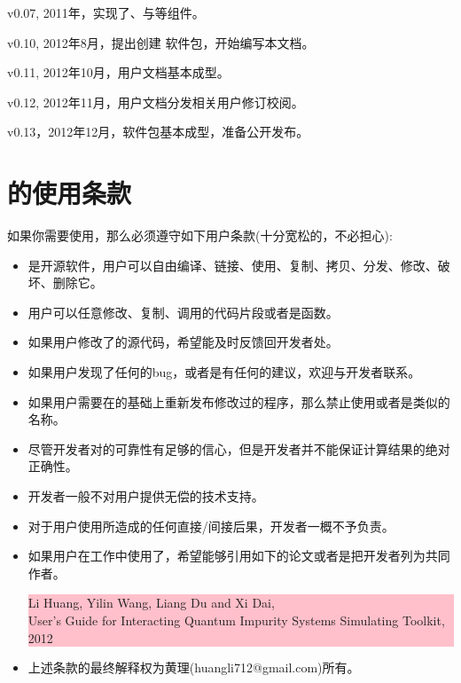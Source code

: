 v0.07, 2011年，实现了{\gardenia}、{\narcissus}与{\lavender}等组件。

v0.10, 2012年8月，提出创建{\iqist} 软件包，开始编写本文档。

v0.11, 2012年10月，用户文档基本成型。

v0.12, 2012年11月，用户文档分发相关用户修订校阅。

v0.13，2012年12月，{\iqist}软件包基本成型，准备公开发布。

\section{{\iqist}的使用条款}
\label{sec:license}

如果你需要使用{\iqist}，那么必须遵守如下用户条款(十分宽松的，不必担心):

\begin{itemize}
\item {\iqist}是开源软件，用户可以自由编译、链接、使用、复制、拷贝、分发、修改、破坏、删除它。
\item 用户可以任意修改、复制、调用{\iqist}的代码片段或者是函数。
\item 如果用户修改了{\iqist}的源代码，希望能及时反馈回开发者处。
\item 如果用户发现了任何的bug，或者是有任何的建议，欢迎与开发者联系。
\item 如果用户需要在{\iqist}的基础上重新发布修改过的程序，那么禁止使用{\iqist}或者是类似的名称。
\item 尽管开发者对{\iqist}的可靠性有足够的信心，但是开发者并不能保证计算结果的绝对正确性。
\item 开发者一般不对用户提供无偿的技术支持。
\item 对于用户使用{\iqist}所造成的任何直接/间接后果，开发者一概不予负责。
\item 如果用户在工作中使用了{\iqist}，希望能够引用如下的论文或者是把开发者列为共同作者。

\noindent\colorbox{pink}{\parbox[r]{\linewidth}{Li Huang, Yilin Wang, Liang Du and Xi Dai, \\ 
User's Guide for Interacting Quantum Impurity Systems Simulating Toolkit, 2012 }}

\item 上述条款的最终解释权为黄理(huangli712@gmail.com)所有。
\end{itemize}
